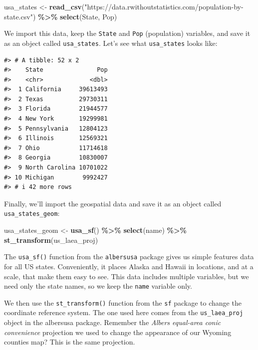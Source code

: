 \documentclass[
]{book}
\newenvironment{Shaded}{\begin{snugshade}}{\end{snugshade}}
\newcommand{\FunctionTok}[1]{\textcolor[rgb]{0.13,0.29,0.53}{\textbf{#1}}}
\newcommand{\NormalTok}[1]{#1}
\newcommand{\OtherTok}[1]{\textcolor[rgb]{0.56,0.35,0.01}{#1}}
\newcommand{\SpecialCharTok}[1]{\textcolor[rgb]{0.81,0.36,0.00}{\textbf{#1}}}
\newcommand{\StringTok}[1]{\textcolor[rgb]{0.31,0.60,0.02}{#1}}
\begin{document}
\begin{Shaded}
\begin{Highlighting}[]
\NormalTok{usa\_states }\OtherTok{\textless{}{-}} \FunctionTok{read\_csv}\NormalTok{(}\StringTok{"https://data.rwithoutstatistics.com/population{-}by{-}state.csv"}\NormalTok{) }\SpecialCharTok{\%\textgreater{}\%}
  \FunctionTok{select}\NormalTok{(State, Pop)}
\end{Highlighting}
\end{Shaded}

We import this data, keep the \texttt{State} and \texttt{Pop} (population) variables, and save it as an object called \texttt{usa\_states}. Let's see what \texttt{usa\_states} looks like:

\begin{verbatim}
#> # A tibble: 52 x 2
#>    State               Pop
#>    <chr>             <dbl>
#>  1 California     39613493
#>  2 Texas          29730311
#>  3 Florida        21944577
#>  4 New York       19299981
#>  5 Pennsylvania   12804123
#>  6 Illinois       12569321
#>  7 Ohio           11714618
#>  8 Georgia        10830007
#>  9 North Carolina 10701022
#> 10 Michigan        9992427
#> # i 42 more rows
\end{verbatim}

Finally, we'll import the geospatial data and save it as an object called \texttt{usa\_states\_geom}:

\begin{Shaded}
\begin{Highlighting}[]
\NormalTok{usa\_states\_geom }\OtherTok{\textless{}{-}} \FunctionTok{usa\_sf}\NormalTok{() }\SpecialCharTok{\%\textgreater{}\%}
  \FunctionTok{select}\NormalTok{(name) }\SpecialCharTok{\%\textgreater{}\%}
  \FunctionTok{st\_transform}\NormalTok{(us\_laea\_proj)}
\end{Highlighting}
\end{Shaded}

The \texttt{usa\_sf()} function from the \texttt{albersusa} package gives us simple features data for all US states. Conveniently, it places Alaska and Hawaii in locations, and at a scale, that make them easy to see. This data includes multiple variables, but we need only the state names, so we keep the \texttt{name} variable only.

We then use the \texttt{st\_transform()} function from the \texttt{sf} package to change the coordinate reference system. The one used here comes from the \texttt{us\_laea\_proj} object in the albersusa package. Remember the \emph{Albers equal-area conic convenience} projection we used to change the appearance of our Wyoming counties map? This is the same projection.
\end{document}
